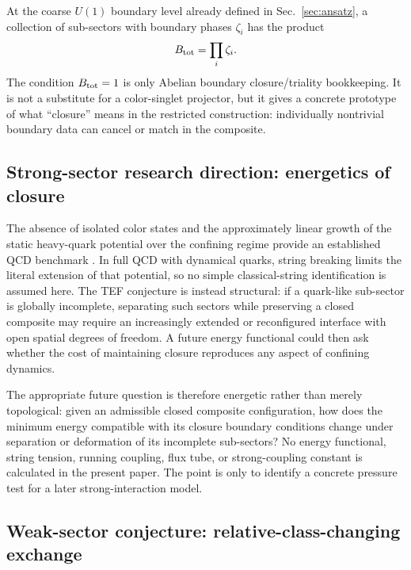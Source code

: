 \documentclass[aps,prd,reprint,superscriptaddress,nofootinbib,longbibliography,floatfix]{revtex4-2}
\begin{document}
At the coarse $U(1)$ boundary level already defined in Sec.~\ref{sec:ansatz}, a collection of sub-sectors with boundary phases $\zeta_i$ has the product
\begin{equation}
B_{\rm tot}=\prod_i\zeta_i.
\label{eq:boundaryproduct}
\end{equation}
The condition $B_{\rm tot}=1$ is only Abelian boundary closure/triality bookkeeping. It is not a substitute for a color-singlet projector, but it gives a concrete prototype of what ``closure'' means in the restricted construction: individually nontrivial boundary data can cancel or match in the composite.

\subsection{Strong-sector research direction: energetics of closure}

The absence of isolated color states and the approximately linear growth of the static heavy-quark potential over the confining regime provide an established QCD benchmark \cite{PDG2026}. In full QCD with dynamical quarks, string breaking limits the literal extension of that potential, so no simple classical-string identification is assumed here. The TEF conjecture is instead structural: if a quark-like sub-sector is globally incomplete, separating such sectors while preserving a closed composite may require an increasingly extended or reconfigured interface with open spatial degrees of freedom. A future energy functional could then ask whether the cost of maintaining closure reproduces any aspect of confining dynamics.

The appropriate future question is therefore energetic rather than merely topological: given an admissible closed composite configuration, how does the minimum energy compatible with its closure boundary conditions change under separation or deformation of its incomplete sub-sectors? No energy functional, string tension, running coupling, flux tube, or strong-coupling constant is calculated in the present paper. The point is only to identify a concrete pressure test for a later strong-interaction model.

\subsection{Weak-sector conjecture: relative-class-changing exchange}
\end{document}
